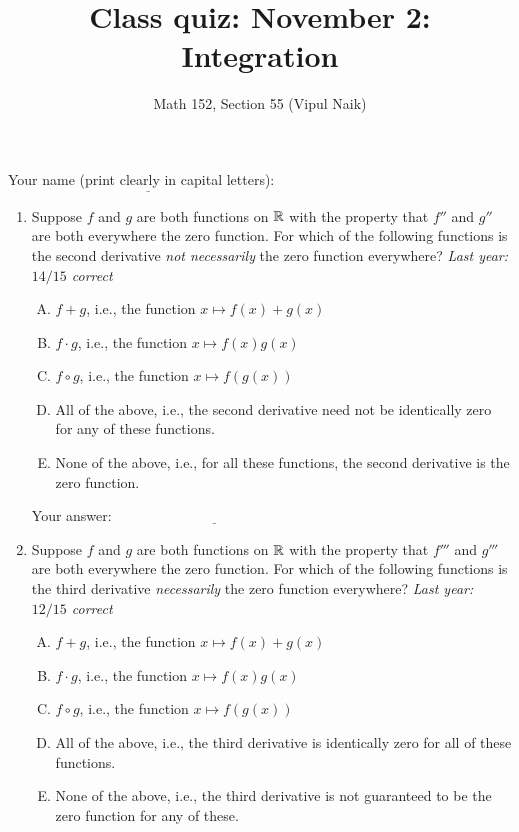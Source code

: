 \documentclass[10pt]{amsart}
\title{Class quiz: November 2: Integration}
\author{Math 152, Section 55 (Vipul Naik)}
\begin{document}
\maketitle

Your name (print clearly in capital letters): $\underline{\qquad\qquad\qquad\qquad\qquad\qquad\qquad\qquad\qquad\qquad}$

\begin{enumerate}

\item Suppose $f$ and $g$ are both functions on $\mathbb{R}$ with the property
  that $f''$ and $g''$ are both everywhere the zero function. For
  which of the following functions is the second derivative {\em not
  necessarily} the zero function everywhere? {\em Last year: $14/15$
  correct}

  \begin{enumerate}[(A)]
  \item $f + g$, i.e., the function $x \mapsto f(x) + g(x)$
  \item $f \cdot g$, i.e., the function $x \mapsto f(x)g(x)$
  \item $f \circ g$, i.e., the function $x \mapsto f(g(x))$
  \item All of the above, i.e., the second derivative need not be
    identically zero for any of these functions.
  \item None of the above, i.e., for all these functions, the second
    derivative is the zero function.
  \end{enumerate}

  \vspace{0.1in}
  Your answer: $\underline{\qquad\qquad\qquad\qquad\qquad\qquad\qquad}$
  \vspace{1in}

\item Suppose $f$ and $g$ are both functions on $\mathbb{R}$ with the property
  that $f'''$ and $g'''$ are both everywhere the zero function. For
  which of the following functions is the third derivative {\em
  necessarily} the zero function everywhere? {\em Last year: $12/15$
  correct}

  \begin{enumerate}[(A)]
  \item $f + g$, i.e., the function $x \mapsto f(x) + g(x)$
  \item $f \cdot g$, i.e., the function $x \mapsto f(x)g(x)$
  \item $f \circ g$, i.e., the function $x \mapsto f(g(x))$
  \item All of the above, i.e., the third derivative is identically
    zero for all of these functions.
  \item None of the above, i.e., the third derivative is not
    guaranteed to be the zero function for any of these.
  \end{enumerate}


\end{enumerate}
\end{document}
